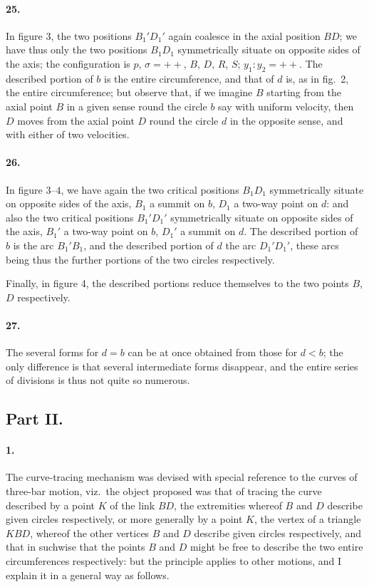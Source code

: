 \documentclass[11pt,a4paper]{article}
\theoremstyle{plain}
\begin{document}
\paragraph{25.} In figure 3, the two positions $B_1'D_1'$ again coalesce in the axial position $BD$; we have thus only the two positions $B_1D_1$ symmetrically situate on opposite sides of the axis; the configuration is $p$, $\sigma = ++$, $B$, $D$, $R$, $S$; $y_1 : y_2 = ++$. The described portion of $b$ is the entire circumference, and that of $d$ is, as in fig.~2, the entire circumference; but observe that, if we imagine $B$ starting from the axial point $B$ in a given sense round the circle $b$ say with uniform velocity, then $D$ moves from the axial point $D$ round the circle $d$ in the opposite sense, and with either of two velocities.

\paragraph{26.} In figure $3\text{--}4$, we have again the two critical positions $B_1D_1$ symmetrically situate on opposite sides of the axis, $B_1$ a summit on $b$, $D_1$ a two-way point on $d$: and also the two critical positions $B_1'D_1'$ symmetrically situate on opposite sides of the axis, $B_1'$ a two-way point on $b$, $D_1'$ a summit on $d$. The described portion of $b$ is the arc $B_1'B_1$, and the described portion of $d$ the arc $D_1'D_1'$, these arcs being thus the further portions of the two circles respectively.

Finally, in figure 4, the described portions reduce themselves to the two points $B$, $D$ respectively.

\paragraph{27.} The several forms for $d = b$ can be at once obtained from those for $d < b$; the only difference is that several intermediate forms disappear, and the entire series of divisions is thus not quite so numerous.

\subsection*{Part II.}

\paragraph{1.} The curve-tracing mechanism was devised with special reference to the curves of three-bar motion, viz.~the object proposed was that of tracing the curve described by a point $K$ of the link $BD$, the extremities whereof $B$ and $D$ describe given circles respectively, or more generally by a point $K$, the vertex of a triangle $KBD$, whereof the other vertices $B$ and $D$ describe given circles respectively, and that in suchwise that the points $B$ and $D$ might be free to describe the two entire circumferences respectively: but the principle applies to other motions, and I explain it in a general way as follows.
\end{document}

